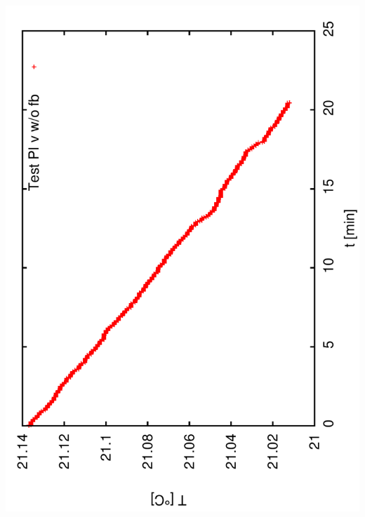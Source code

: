 \documentclass[a4paper,11pt]{book}
\begin{document}
\includegraphics[angle=-90,scale=0.15]{image11a.pdf}\\
\end{document}
